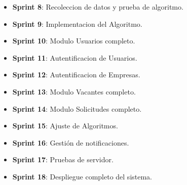 \begin{itemize}
    \item \textbf{Sprint 8}:  Recoleccion de datos y prueba de algoritmo.
    \item \textbf{Sprint 9}:  Implementacion del Algoritmo.
    \item \textbf{Sprint 10}: Modulo Usuarios completo.
    \item \textbf{Sprint 11}: Autentificacion de Usuarios. 
    \item \textbf{Sprint 12}: Autentificacion de Empresas.
    \item \textbf{Sprint 13}: Modulo Vacantes completo.
    \item \textbf{Sprint 14}: Modulo Solicitudes completo.
    \item \textbf{Sprint 15}: Ajuste de Algoritmos.
    \item \textbf{Sprint 16}: Gestión de notificaciones.
    \item \textbf{Sprint 17}: Pruebas de servidor.
    \item \textbf{Sprint 18}: Despliegue completo del sistema.
\end{itemize}
